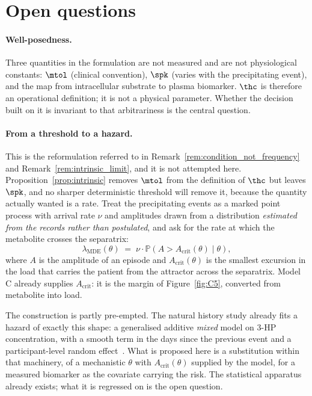 \section{Open questions}

\paragraph{Well-posedness.} Three quantities in the formulation are not measured and are
not physiological constants: $\mtol$ (clinical convention), $\spk$ (varies with the
precipitating event), and the map from intracellular substrate to plasma biomarker. $\thc$
is therefore an operational definition; it is not a physical parameter. Whether the
decision built on it is invariant to that arbitrariness is the central question.

\paragraph{From a threshold to a hazard.} This is the reformulation referred to in
Remark~\ref{rem:condition_not_frequency} and Remark~\ref{rem:intrinsic_limit}, and it is
not attempted here. Proposition~\ref{prop:intrinsic} removes $\mtol$ from the definition
of $\thc$ but leaves $\spk$, and no sharper deterministic threshold will remove it, because
the quantity actually wanted is a rate. Treat the precipitating events as a marked
point process with arrival rate $\nu$ and amplitudes drawn from a distribution
\emph{estimated from the records rather than postulated}, and ask for the rate at which the
metabolite crosses the separatrix:
\begin{equation}
\lambda_{\mathrm{MDE}}(\theta) \;=\; \nu \cdot
\mathbb{P}\!\left(A > A_{\mathrm{crit}}(\theta) \mid \theta \right),
\label{eq:hazard}
\end{equation}
where $A$ is the amplitude of an episode and $A_{\mathrm{crit}}(\theta)$ is the smallest
excursion in the load that carries the patient from the attractor across the separatrix.
Model C already supplies $A_{\mathrm{crit}}$: it is the margin of Figure~\ref{fig:C5},
converted from metabolite into load.

The construction is partly pre-empted. The natural history study already fits a hazard of
exactly this
shape: a generalised additive \emph{mixed} model on 3-HP concentration, with a smooth term
in the days since the previous event and a participant-level random
effect~\cite{natural_history}. %
What is proposed here is a substitution within that machinery, of a mechanistic $\theta$
with $A_{\mathrm{crit}}(\theta)$ supplied by the model, for a measured biomarker as the
covariate carrying the risk. The statistical apparatus already exists; what it is
regressed on is the open question.

